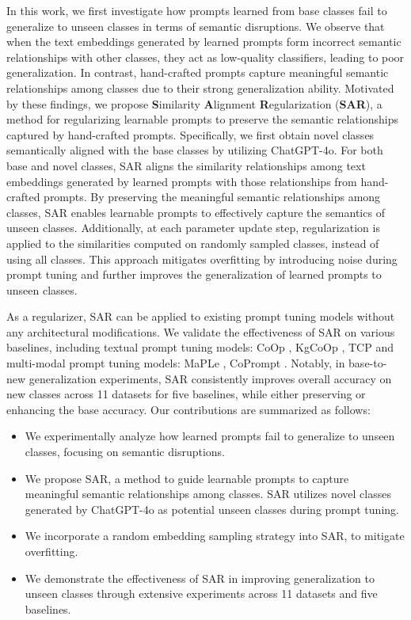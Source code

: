 In this work, we first investigate how prompts learned from base classes fail to generalize to unseen classes in terms of semantic disruptions. We observe that when the text embeddings generated by learned prompts form incorrect semantic relationships with other classes, they act as low-quality classifiers, leading to poor generalization. In contrast, hand-crafted prompts capture meaningful semantic relationships among classes due to their strong generalization ability. Motivated by these findings, we propose \textbf{S}imilarity \textbf{A}lignment \textbf{R}egularization (\textbf{SAR}), a method for regularizing learnable prompts to preserve the semantic relationships captured by hand-crafted prompts. Specifically, we first obtain novel classes semantically aligned with the base classes by utilizing ChatGPT-4o. For both base and novel classes, SAR aligns the similarity relationships among text embeddings generated by learned prompts with those relationships from hand-crafted prompts. By preserving the meaningful semantic relationships among classes, SAR enables learnable prompts to effectively capture the semantics of unseen classes. Additionally, at each parameter update step, regularization is applied to the similarities computed on randomly sampled classes, instead of using all classes. This approach mitigates overfitting by introducing noise during prompt tuning and further improves the generalization of learned prompts to unseen classes.

As a regularizer, SAR can be applied to existing prompt tuning models without any architectural modifications. We validate the effectiveness of SAR on various baselines, including textual prompt tuning models: CoOp \cite{zhou2022learning}, KgCoOp \cite{yao2023kgcoop}, TCP \cite{yao2024tcp} and multi-modal prompt tuning models: MaPLe \cite{khattak2023maple}, CoPrompt \cite{roy2024coprompt}. Notably, in base-to-new generalization experiments, SAR consistently improves overall accuracy on new classes across 11 datasets for five baselines, while either preserving or enhancing the base accuracy. Our contributions are summarized as follows:
\begin{itemize}[itemsep=0.5em, topsep=0.5em]
    \item We experimentally analyze how learned prompts fail to generalize to unseen classes, focusing on semantic disruptions.
    \item We propose SAR, a method to guide learnable prompts to capture meaningful semantic relationships among classes. SAR utilizes novel classes generated by ChatGPT-4o as potential unseen classes during prompt tuning.
    \item We incorporate a random embedding sampling strategy into SAR, to mitigate overfitting.
    \item We demonstrate the effectiveness of SAR in improving generalization to unseen classes through extensive experiments across 11 datasets and five baselines.
\end{itemize}
